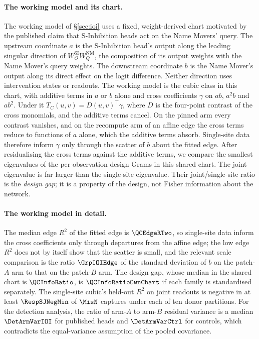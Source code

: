 \paragraph{The working model and its chart.} The working model of \S\ref{sec:ioi} uses a fixed, weight-derived chart
motivated by the published claim that S-Inhibition heads act on the Name Movers' query. The upstream coordinate $a$ is
the S-Inhibition head's output along the leading singular direction of $W_O^{\mathrm{SI}}W_Q^{\mathrm{NM}}$, the
composition of its output weights with the Name Mover's query weights. The downstream coordinate $b$ is the Name
Mover's output along its direct effect on the logit difference. Neither direction uses intervention states or
readouts. The working model is the cubic class in this chart, with additive terms in $a$ or $b$ alone and cross
coefficients $\gamma$ on $ab$, $a^2b$ and $ab^2$. Under it $T_C(u,v)=D(u,v)^\top\gamma$, where $D$ is the four-point
contrast of the cross monomials, and the additive terms cancel. On the pinned arm every contrast vanishes, and on the
recompute arm of an affine edge the cross terms reduce to functions of $a$ alone, which the additive terms absorb.
Single-site data therefore inform $\gamma$ only through the scatter of $b$ about the fitted edge. After residualising
the cross terms against the additive terms, we compare the smallest eigenvalues of the per-observation design Grams
in this shared chart. The joint eigenvalue is far larger than the single-site eigenvalue. Their joint/single-site
ratio is the \emph{design gap}; it is a property of the design, not Fisher information about the network.

\paragraph{The working model in detail.} The median edge $R^2$ of the fitted edge is $\QCEdgeRTwo$, so single-site data
inform the cross coefficients only through departures from the affine edge; the low edge $R^2$ does not by itself show that the scatter is small, and the relevant scale comparison is the ratio $\GrpIOIEdge$ of the standard deviation of $b$ on the patch-$A$ arm to that on the patch-$B$ arm. The design gap, whose median in the shared chart is $\QCInfoRatio$, is $\QCInfoRatioOwnChart$ if each family is
standardised separately. The single-site cubic's held-out $R^2$ on joint readouts is negative in at least
$\RespSJNegMin$ of $\MisN$ captures under each of ten donor partitions. For the detection analysis, the ratio of arm-$A$
to arm-$B$ residual variance is a median $\DetArmVarIOI$ for published heads and $\DetArmVarCtrl$ for controls, which
contradicts the equal-variance assumption of the pooled covariance.

